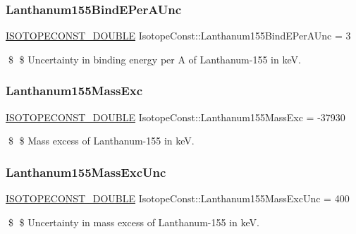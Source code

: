 \subsubsection{\texorpdfstring{Lanthanum155\+Bind\+E\+Per\+A\+Unc}{Lanthanum155BindEPerAUnc}}
{\footnotesize\ttfamily \mbox{\hyperlink{group___isotope_const-_macros_ga8f45a7272ce02c0b4c65c44636ed719a}{I\+S\+O\+T\+O\+P\+E\+C\+O\+N\+S\+T\+\_\+\+D\+O\+U\+B\+LE}} Isotope\+Const\+::\+Lanthanum155\+Bind\+E\+Per\+A\+Unc = 3}

\$ \$ Uncertainty in binding energy per A of Lanthanum-\/155 in keV. \mbox{\label{group___isotope_const-_lanthanum-_la155_ga088d50a828dbc5d9a633d17cf5518f34}} 
\subsubsection{\texorpdfstring{Lanthanum155\+Mass\+Exc}{Lanthanum155MassExc}}
{\footnotesize\ttfamily \mbox{\hyperlink{group___isotope_const-_macros_ga8f45a7272ce02c0b4c65c44636ed719a}{I\+S\+O\+T\+O\+P\+E\+C\+O\+N\+S\+T\+\_\+\+D\+O\+U\+B\+LE}} Isotope\+Const\+::\+Lanthanum155\+Mass\+Exc = -\/37930}

\$ \$ Mass excess of Lanthanum-\/155 in keV. \mbox{\label{group___isotope_const-_lanthanum-_la155_ga9952ebee8e23b79005d70628398ef18e}} 
\subsubsection{\texorpdfstring{Lanthanum155\+Mass\+Exc\+Unc}{Lanthanum155MassExcUnc}}
{\footnotesize\ttfamily \mbox{\hyperlink{group___isotope_const-_macros_ga8f45a7272ce02c0b4c65c44636ed719a}{I\+S\+O\+T\+O\+P\+E\+C\+O\+N\+S\+T\+\_\+\+D\+O\+U\+B\+LE}} Isotope\+Const\+::\+Lanthanum155\+Mass\+Exc\+Unc = 400}

\$ \$ Uncertainty in mass excess of Lanthanum-\/155 in keV. \mbox{\label{group___isotope_const-_lanthanum-_la155_gaec5e6fe5cd2b0c13889bc6798459a9e3}} 
